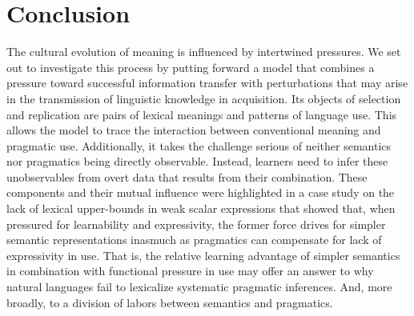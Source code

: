 \documentclass[a4paper]{article}
\begin{document}
\section{Conclusion}
The cultural evolution of meaning is influenced by intertwined pressures. We set out to investigate this process by putting forward a model that combines a pressure toward successful information transfer with perturbations that may arise in the transmission of linguistic knowledge in acquisition. Its objects of selection and replication are pairs of lexical meanings and patterns of language use. This allows the model to trace the interaction between conventional meaning and pragmatic use. Additionally, it takes the challenge serious of neither semantics nor pragmatics being directly observable. Instead, learners need to infer these unobservables from overt data that results from their combination.  These components and their mutual influence were highlighted in a case study on the lack of lexical upper-bounds in weak scalar expressions that showed that, when pressured for learnability and expressivity, the former force drives for simpler semantic representations inasmuch as pragmatics can compensate for lack of expressivity in use. That is, the relative learning advantage of simpler semantics in combination with functional pressure in use may offer an answer to why natural languages fail to lexicalize systematic pragmatic inferences. And, more broadly, to a division of labors between semantics and pragmatics.




\end{document}
